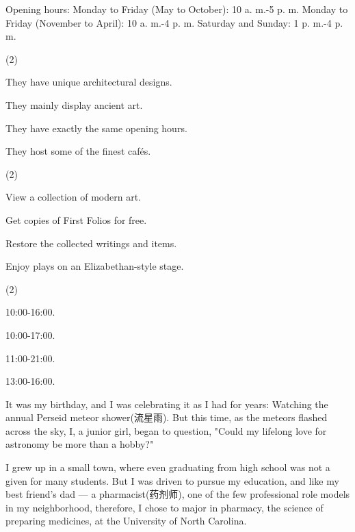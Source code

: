\documentclass{英语试卷}
\begin{document}
\par Opening hours: Monday to Friday (May to October): 10 a. m.-5 p. m. Monday to Friday (November to April): 10 a. m.-4 p. m. Saturday and Sunday: 1 p. m.-4 p. m.\par
{}
\begin{choices}(2)
  \item They have unique architectural designs.
  \item They mainly display ancient art.
  \item They have exactly the same opening hours.
  \item They host some of the finest cafés.
\end{choices}
\begin{choices}(2)
  \item View a collection of modern art.
  \item Get copies of First Folios for free.
  \item Restore the collected writings and items.
  \item Enjoy plays on an Elizabethan-style stage.
\end{choices}
\begin{choices}(2)
  \item 10:00-16:00.
  \item 10:00-17:00.
  \item 11:00-21:00.
  \item 13:00-16:00.
\end{choices}
\par It was my birthday, and I was celebrating it as I had for years: Watching the annual Perseid meteor shower(流星雨). But this time, as the meteors flashed across the sky, I, a junior girl, began to question, "Could my lifelong love for astronomy be more than a hobby?"\par
\par I grew up in a small town, where even graduating from high school was not a given for many students. But I was driven to pursue my education, and like my best friend's dad — a pharmacist(药剂师), one of the few professional role models in my neighborhood, therefore, I chose to major in pharmacy, the science of preparing medicines, at the University of North Carolina.\par
\end{document}
